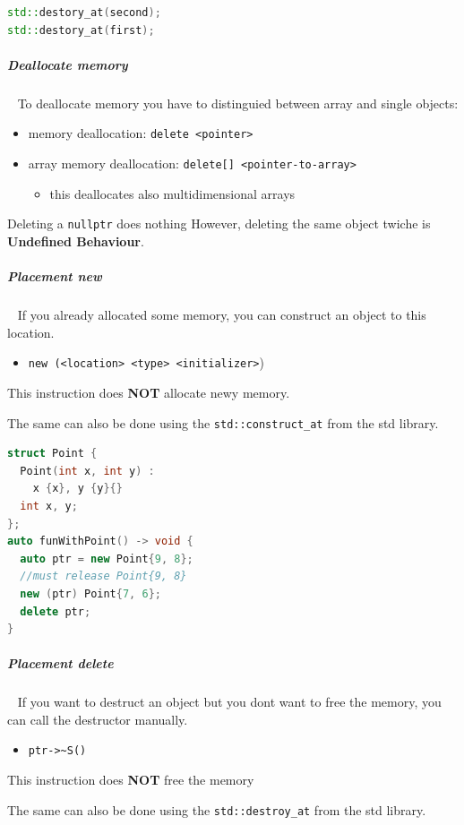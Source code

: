\documentclass[11pt,twoside,landscape]{article}
\begin{document}
\begin{multicols}{2}
\begin{lstlisting}[language=c++,label=lst:example-for-a-non-default-constructible-type-on-the-heap,caption={Example for a non default constructible type on the heap},captionpos=b,numbers=none]
std::destory_at(second);
std::destory_at(first);
\end{lstlisting}

\subparagraph{Deallocate memory} \
\label{sec:org7fed57c}
To deallocate memory you have to distinguied between array and single objects:
\begin{itemize}
\item memory deallocation: \texttt{delete <pointer>}
\item array memory deallocation: \texttt{delete[] <pointer-to-array>}
\begin{itemize}
\item this deallocates also multidimensional arrays
\end{itemize}
\end{itemize}


Deleting a \texttt{nullptr} does nothing
However, deleting the same object twiche is \textbf{Undefined Behaviour}.
\subparagraph{Placement new} \
\label{sec:org57e00ea}
If you already allocated some memory, you can construct an object to this location.
\begin{itemize}
\item \texttt{new (<location> <type> <initializer>})
\end{itemize}

This instruction does \textbf{NOT} allocate newy memory.

The same can also be done using the \texttt{std::construct\_at} from the std library.




\begin{lstlisting}[language=c++,numbers=none]
struct Point {
  Point(int x, int y) :
    x {x}, y {y}{}
  int x, y;
};
auto funWithPoint() -> void {
  auto ptr = new Point{9, 8};
  //must release Point{9, 8}
  new (ptr) Point{7, 6};
  delete ptr;
}
\end{lstlisting}

\subparagraph{Placement delete} \
\label{sec:orgff22172}
If you want to destruct an object but you dont want to free the memory, you can call the destructor manually.
\begin{itemize}
\item \texttt{ptr->\textasciitilde{}S()}
\end{itemize}

This instruction does \textbf{NOT} free the memory

The same can also be done using the \texttt{std::destroy\_at} from the std library.



\end{multicols}
\end{document}
